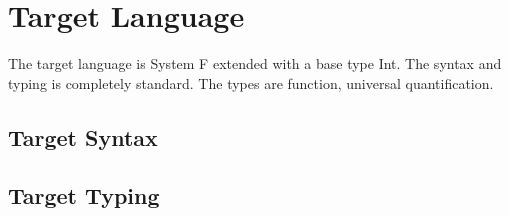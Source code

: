 \section{Target Language}

The target language is System F extended with a base type Int. The syntax and
typing is completely standard. The types are function, universal quantification.

\subsection{Target Syntax}

\subsection{Target Typing}
